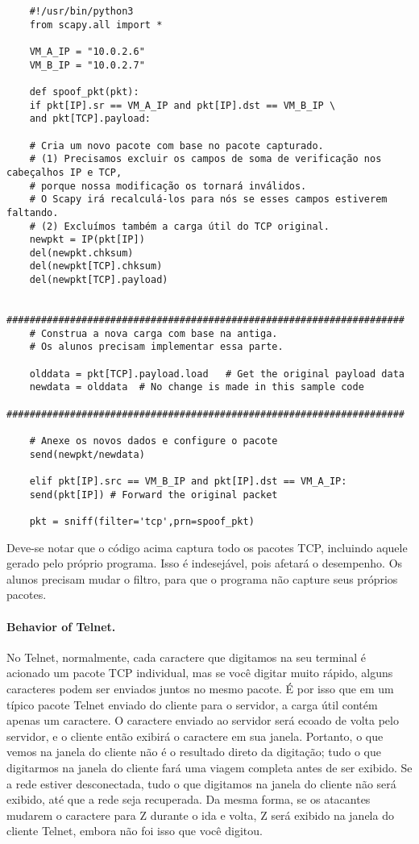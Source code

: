 	\begin{lstlisting}
	#!/usr/bin/python3
	from scapy.all import *
	
	VM_A_IP = "10.0.2.6"
	VM_B_IP = "10.0.2.7"
	
	def spoof_pkt(pkt):
	if pkt[IP].sr == VM_A_IP and pkt[IP].dst == VM_B_IP \
	and pkt[TCP].payload:
	
	# Cria um novo pacote com base no pacote capturado.
	# (1) Precisamos excluir os campos de soma de verificação nos cabeçalhos IP e TCP,
	# porque nossa modificação os tornará inválidos.
	# O Scapy irá recalculá-los para nós se esses campos estiverem faltando.
	# (2) Excluímos também a carga útil do TCP original.
	newpkt = IP(pkt[IP])
	del(newpkt.chksum)  
	del(newpkt[TCP].chksum) 
	del(newpkt[TCP].payload) 
	
	#####################################################################
	# Construa a nova carga com base na antiga.
	# Os alunos precisam implementar essa parte.
	
	olddata = pkt[TCP].payload.load   # Get the original payload data 
	newdata = olddata  # No change is made in this sample code
	#####################################################################
	
	# Anexe os novos dados e configure o pacote
	send(newpkt/newdata)
	
	elif pkt[IP].src == VM_B_IP and pkt[IP].dst == VM_A_IP:
	send(pkt[IP]) # Forward the original packet
	
	pkt = sniff(filter='tcp',prn=spoof_pkt)
	\end{lstlisting}
	
	
	Deve-se notar que o código acima captura todo os pacotes TCP,
	incluindo aquele gerado pelo próprio programa. Isso é
	indesejável, pois afetará
	o desempenho. Os alunos precisam mudar o filtro, para que o programa não capture
	seus próprios pacotes.
	
	
	\paragraph{Behavior of Telnet.}
	No Telnet, normalmente, cada caractere que digitamos na seu terminal é acionado
	um pacote TCP individual, mas se você digitar muito rápido, alguns caracteres podem ser
	enviados juntos no mesmo pacote.
	É por isso que em um típico pacote Telnet enviado do cliente para o servidor,
	a carga útil contém apenas um caractere. O 
	caractere enviado ao servidor será ecoado de volta pelo servidor,
	e o cliente então exibirá o
	caractere em sua janela. Portanto, o que vemos na janela do cliente não é o resultado direto
	da digitação; tudo o que digitarmos na janela do cliente fará uma viagem completa antes de ser exibido.
	Se a rede estiver desconectada, tudo o que digitamos na janela do cliente não será exibido,
	até que a rede seja recuperada. Da mesma forma, se os atacantes mudarem o caractere para Z durante o
	ida e volta, Z será exibido na janela do cliente Telnet, embora
	não foi isso que você digitou.
	
